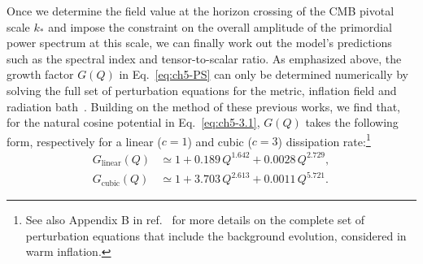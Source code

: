 Once we determine the field value at the horizon crossing of the CMB pivotal scale $k_{*}$ and impose the constraint on the overall amplitude of the primordial power spectrum at this scale, we can finally work out the model's predictions such as the spectral index and tensor-to-scalar ratio. As emphasized above, the growth factor $G(Q)$ in Eq.~\ref{eq:ch5-PS} can only be determined numerically by solving the full set of perturbation equations for the metric, inflation field and radiation bath~\cite{Graham:2009bf,Bastero-Gil:2011rva,Ramos:2013nsa,Bastero-Gil:2014jsa}. Building on the method of these previous works, we find that, for the natural cosine potential in Eq.~\ref{eq:ch5-3.1}, $G(Q)$ takes the following form, respectively for a linear ($c=1$) and cubic ($c=3$) dissipation rate:\footnote{See also Appendix B in ref.~\cite{Das:2020xmh} for more details on the complete set of perturbation equations that include the background evolution, considered in warm inflation.}
\begin{align}
    G_{\mathrm{linear}}\left(Q\right) &\simeq 1+0.189\,Q^{1.642}+0.0028\,Q^{2.729}, \label{eq:ch5-G_1}\\
    G_{\mathrm{cubic}}\left(Q\right) &\simeq 1+3.703\,Q^{2.613}+0.0011\,Q^{5.721}. \label{eq:ch5-G_3}
\end{align}


